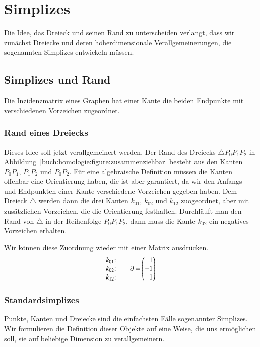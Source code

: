%
%
%
\section{Simplizes
\label{buch:section:simplexe}}
Die Idee, das Dreieck und seinen Rand zu unterscheiden verlangt,
dass wir zunächst Dreiecke und deren höherdimensionale Verallgemeinerungen,
die sogenannten Simplizes entwickeln müssen.

\subsection{Simplizes und Rand
\label{buch:subsection:simplices}}
Die Inzidenzmatrix eines Graphen hat einer Kante die beiden Endpunkte
mit verschiedenen Vorzeichen zugeordnet.

\subsubsection{Rand eines Dreiecks}
Dieses Idee soll jetzt verallgemeinert werden.
Der Rand des Dreiecks $\triangle P_0P_1P_2$ in
Abbildung~\ref{buch:homologie:figure:zusammenziehbar}
besteht aus den Kanten $P_0P_1$, $P_1P_2$ und $P_0P_2$.
Für eine algebraische Definition müssen die Kanten offenbar eine
Orientierung haben, die ist aber garantiert, da wir den Anfangs-
und Endpunkten einer Kante verschiedene Vorzeichen gegeben haben.
Dem Dreieck $\triangle$ werden dann die drei Kanten $k_{01}$, $k_{02}$
und $k_{12}$ zuogeordnet, aber mit zusätzlichen Vorzeichen, die
die Orientierung festhalten.
Durchläuft man den Rand von $\triangle$ in der Reihenfolge $P_0P_1P_2$,
dann muss die Kante $k_{02}$ ein negatives Vorzeichen erhalten.

Wir können diese Zuordnung wieder mit einer Matrix ausdrücken.
\[
\begin{matrix}
\text{$k_{01}$:}\mathstrut\\
\text{$k_{02}$:}\mathstrut\\
\text{$k_{12}$:}\mathstrut
\end{matrix}
\qquad
\partial
=
\begin{pmatrix*}[r]
1\mathstrut\\
-1\mathstrut\\
1\mathstrut
\end{pmatrix*}
\]

\subsubsection{Standardsimplizes}
Punkte, Kanten und Dreiecke sind die einfachsten Fälle sogenannter
Simplizes.
Wir formulieren die Definition dieser Objekte auf eine Weise,
die uns ermöglichen soll, sie auf beliebige Dimension zu verallgemeinern.

